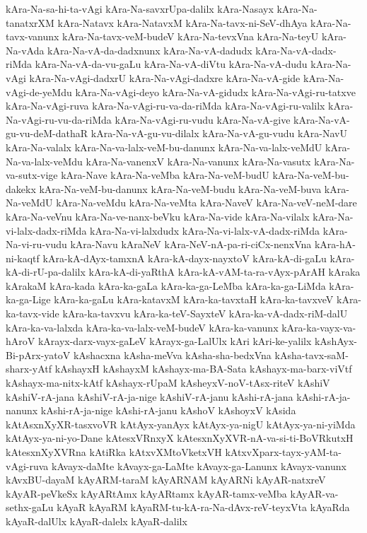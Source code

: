 {kAra-Na-sa-hi-ta-vAgi
kAra-Na-savxrUpa-dalilx
kAra-Nasayx
kAra-Na-tanatxrXM
kAra-Natavx
kAra-NatavxM
kAra-Na-tavx-ni-SeV-dhAya
kAra-Na-tavx-vanunx
kAra-Na-tavx-veM-budeV
kAra-Na-tevxVna
kAra-Na-teyU
kAra-Na-vAda
kAra-Na-vA-da-dadxnunx
kAra-Na-vA-dadudx
kAra-Na-vA-dadx-riMda
kAra-Na-vA-da-vu-gaLu
kAra-Na-vA-diVtu
kAra-Na-vA-dudu
kAra-Na-vAgi
kAra-Na-vAgi-dadxrU
kAra-Na-vAgi-dadxre
kAra-Na-vA-gide
kAra-Na-vAgi-de-yeMdu
kAra-Na-vAgi-deyo
kAra-Na-vA-gidudx
kAra-Na-vAgi-ru-tatxve
kAra-Na-vAgi-ruva
kAra-Na-vAgi-ru-va-da-riMda
kAra-Na-vAgi-ru-valilx
kAra-Na-vAgi-ru-vu-da-riMda
kAra-Na-vAgi-ru-vudu
kAra-Na-vA-give
kAra-Na-vA-gu-vu-deM-dathaR
kAra-Na-vA-gu-vu-dilalx
kAra-Na-vA-gu-vudu
kAra-NavU
kAra-Na-valalx
kAra-Na-va-lalx-veM-bu-danunx
kAra-Na-va-lalx-veMdU
kAra-Na-va-lalx-veMdu
kAra-Na-vanenxV
kAra-Na-vanunx
kAra-Na-vasutx
kAra-Na-va-sutx-vige
kAra-Nave
kAra-Na-veMba
kAra-Na-veM-budU
kAra-Na-veM-bu-dakekx
kAra-Na-veM-bu-danunx
kAra-Na-veM-budu
kAra-Na-veM-buva
kAra-Na-veMdU
kAra-Na-veMdu
kAra-Na-veMta
kAra-NaveV
kAra-Na-veV-neM-dare
kAra-Na-veVnu
kAra-Na-ve-nanx-beVku
kAra-Na-vide
kAra-Na-vilalx
kAra-Na-vi-lalx-dadx-riMda
kAra-Na-vi-lalxdudx
kAra-Na-vi-lalx-vA-dadx-riMda
kAra-Na-vi-ru-vudu
kAra-Navu
kAraNeV
kAra-NeV-nA-pa-ri-ciCx-nenxVna
kAra-hA-ni-kaqtf
kAra-kA-dAyx-tamxnA
kAra-kA-dayx-nayxtoV
kAra-kA-di-gaLu
kAra-kA-di-rU-pa-dalilx
kAra-kA-di-yaRthA
kAra-kA-vAM-ta-ra-vAyx-pArAH
kAraka
kArakaM
kAra-kada
kAra-ka-gaLa
kAra-ka-ga-LeMba
kAra-ka-ga-LiMda
kAra-ka-ga-Lige
kAra-ka-gaLu
kAra-katavxM
kAra-ka-tavxtaH
kAra-ka-tavxveV
kAra-ka-tavx-vide
kAra-ka-tavxvu
kAra-ka-teV-SayxteV
kAra-ka-vA-dadx-riM-dalU
kAra-ka-va-lalxda
kAra-ka-va-lalx-veM-budeV
kAra-ka-vanunx
kAra-ka-vayx-va-hAroV
kArayx-darx-vayx-gaLeV
kArayx-ga-LalUlx
kAri
kAri-ke-yalilx
kAshAyx-Bi-pArx-yatoV
kAshacxna
kAsha-meVva
kAsha-sha-bedxVna
kAsha-tavx-saM-sharx-yAtf
kAshayxH
kAshayxM
kAshayx-ma-BA-Sata
kAshayx-ma-barx-viVtf
kAshayx-ma-nitx-kAtf
kAshayx-rUpaM
kAsheyxV-noV-tAsx-riteV
kAshiV
kAshiV-rA-jana
kAshiV-rA-ja-nige
kAshiV-rA-janu
kAshi-rA-jana
kAshi-rA-ja-nanunx
kAshi-rA-ja-nige
kAshi-rA-janu
kAshoV
kAshoyxV
kAsida
kAtAsxnXyXR-tasxvoVR
kAtAyx-yanAyx
kAtAyx-ya-nigU
kAtAyx-ya-ni-yiMda
kAtAyx-ya-ni-yo-Dane
kAtesxVRnxyX
kAtesxnXyXVR-nA-va-si-ti-BoVRkutxH
kAtesxnXyXVRna
kAtiRka
kAtxvXMtoVketxVH
kAtxvXparx-tayx-yAM-ta-vAgi-ruva
kAvayx-daMte
kAvayx-ga-LaMte
kAvayx-ga-Lanunx
kAvayx-vanunx
kAvxBU-dayaM
kAyARM-taraM
kAyARNAM
kAyARNi
kAyAR-natxreV
kAyAR-peVkeSx
kAyARtAmx
kAyARtamx
kAyAR-tamx-veMba
kAyAR-va-sethx-gaLu
kAyaR
kAyaRM
kAyaRM-tu-kA-ra-Na-dAvx-reV-teyxVta
kAyaRda
kAyaR-dalUlx
kAyaR-dalelx
kAyaR-dalilx
}
